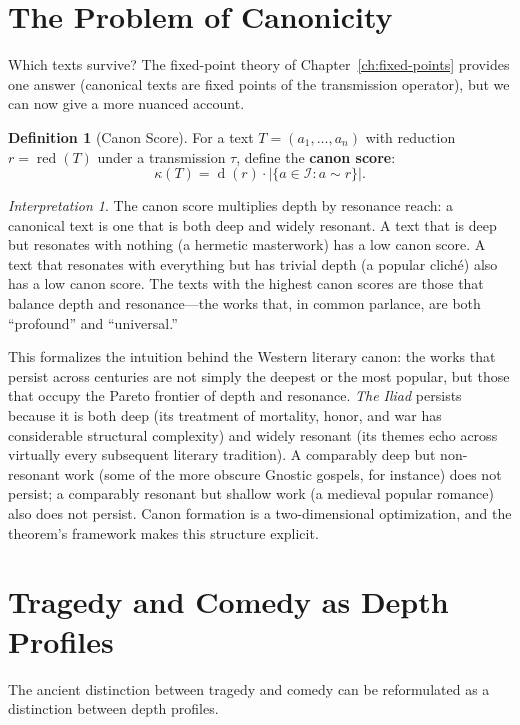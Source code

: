 \documentclass[11pt,openany]{book}
\theoremstyle{definition}
\newtheorem{definition}[axiom]{Definition}
\theoremstyle{plain}
\theoremstyle{remark}
\newtheorem{interpretation}[axiom]{Interpretation}
\newcommand{\IS}{\mathcal{I}}               %
\newcommand{\res}{\sim}                      %
\newcommand{\depth}{\operatorname{d}}       %
\newcommand{\transmit}{\tau}                 %
\begin{document}
\section{The Problem of Canonicity}

Which texts survive? The fixed-point theory of Chapter~\ref{ch:fixed-points} provides one answer (canonical texts are fixed points of the transmission operator), but we can now give a more nuanced account.

\begin{definition}[Canon Score]
For a text $T = (a_1, \ldots, a_n)$ with reduction $r = \operatorname{red}(T)$ under a transmission $\transmit$, define the \textbf{canon score}:
\[
\kappa(T) = \depth(r) \cdot |\{a \in \IS : a \res r\}|.
\]
\end{definition}

\begin{interpretation}
The canon score multiplies depth by resonance reach: a canonical text is one that is both deep and widely resonant. A text that is deep but resonates with nothing (a hermetic masterwork) has a low canon score. A text that resonates with everything but has trivial depth (a popular cliché) also has a low canon score. The texts with the highest canon scores are those that balance depth and resonance---the works that, in common parlance, are both ``profound'' and ``universal.''

This formalizes the intuition behind the Western literary canon: the works that persist across centuries are not simply the deepest or the most popular, but those that occupy the Pareto frontier of depth and resonance. \textit{The Iliad} persists because it is both deep (its treatment of mortality, honor, and war has considerable structural complexity) and widely resonant (its themes echo across virtually every subsequent literary tradition). A comparably deep but non-resonant work (some of the more obscure Gnostic gospels, for instance) does not persist; a comparably resonant but shallow work (a medieval popular romance) also does not persist. Canon formation is a two-dimensional optimization, and the theorem's framework makes this structure explicit.
\end{interpretation}

\section{Tragedy and Comedy as Depth Profiles}

The ancient distinction between tragedy and comedy can be reformulated as a distinction between depth profiles.
\end{document}
